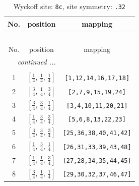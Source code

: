 \documentclass[fleqn,8pt]{jsarticle}
\begin{document}
\renewcommand{\arraystretch}{1.2}
\begin{longtable}{ccc}
\caption{Wyckoff site: {\tt 8c}, site symmetry: {\tt .32}}
 \\
 \hline \hline
No. & position & mapping \\ \hline \endfirsthead

\multicolumn{2}{l}{\tablename\ \thetable{}} \\
 \hline \hline
No. & position & mapping \\ \hline \endhead

 \hline \hline
\multicolumn{2}{r}{\footnotesize\it continued ...} \\ \endfoot

 \hline \hline
\multicolumn{2}{r}{} \\ \endlastfoot

1 & $\left[ \frac{1}{4},\, \frac{1}{4},\, \frac{1}{4} \right]$ & {\tt [1,12,14,16,17,18]} \\ \hline
2 & $\left[ \frac{3}{4},\, \frac{1}{4},\, \frac{3}{4} \right]$ & {\tt [2,7,9,15,19,24]} \\ \hline
3 & $\left[ \frac{3}{4},\, \frac{3}{4},\, \frac{1}{4} \right]$ & {\tt [3,4,10,11,20,21]} \\ \hline
4 & $\left[ \frac{1}{4},\, \frac{3}{4},\, \frac{3}{4} \right]$ & {\tt [5,6,8,13,22,23]} \\ \hline
5 & $\left[ \frac{3}{4},\, \frac{3}{4},\, \frac{3}{4} \right]$ & {\tt [25,36,38,40,41,42]} \\ \hline
6 & $\left[ \frac{1}{4},\, \frac{3}{4},\, \frac{1}{4} \right]$ & {\tt [26,31,33,39,43,48]} \\ \hline
7 & $\left[ \frac{1}{4},\, \frac{1}{4},\, \frac{3}{4} \right]$ & {\tt [27,28,34,35,44,45]} \\ \hline
8 & $\left[ \frac{3}{4},\, \frac{1}{4},\, \frac{1}{4} \right]$ & {\tt [29,30,32,37,46,47]} \\
\end{longtable}
\renewcommand{\arraystretch}{1.2}
\end{document}
